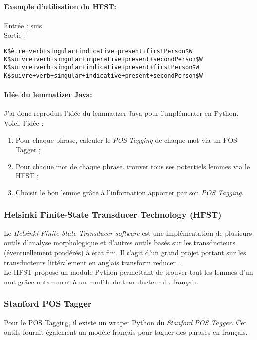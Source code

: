             \paragraph{Exemple d'utilisation du HFST:}
                Entrée : \og suis \fg\\
                Sortie :
\begin{lstlisting}
K$être+verb+singular+indicative+present+firstPerson$W
K$suivre+verb+singular+imperative+present+secondPerson$W
K$suivre+verb+singular+indicative+present+firstPerson$W
K$suivre+verb+singular+indicative+present+secondPerson$W
\end{lstlisting}

            \paragraph{Idée du lemmatizer Java:}
                J'ai donc reproduis l'idée du lemmatizer Java pour l'implémenter en Python. Voici, l'idée :
                \begin{enumerate}
                    \item Pour chaque phrase, calculer le \textit{POS Tagging} de chaque mot via un POS Tagger ;
                    \item Pour chaque mot de chaque phrase, trouver tous ses potentiels lemmes via le HFST ;
                    \item Choisir le bon lemme grâce à l'information apporter par son \textit{POS Tagging}.
                \end{enumerate}

        \subsubsection{Helsinki Finite-State Transducer Technology (HFST)}
            Le \textit{Helsinki Finite-State Transducer software} est une implémentation de plusieurs outils d'analyse morphologique et d'autres outils basés sur les transducteurs (éventuellement pondérés) à état fini. Il s'agit d'un \href{http://www.ling.helsinki.fi/kieliteknologia/tutkimus/hfst/}{grand projet} portant sur les transducteurs littéralement en anglais \og transform reducer \fg.\\
            Le HFST propose un module Python permettant de trouver tout les lemmes d'un mot grâce notamment à un modèle de transducteur du français.

        \subsubsection{Stanford POS Tagger}
            Pour le POS Tagging, il existe un wraper Python du \textit{Stanford POS Tagger}. Cet outils fournit également un modèle français pour taguer des phrases en français.

